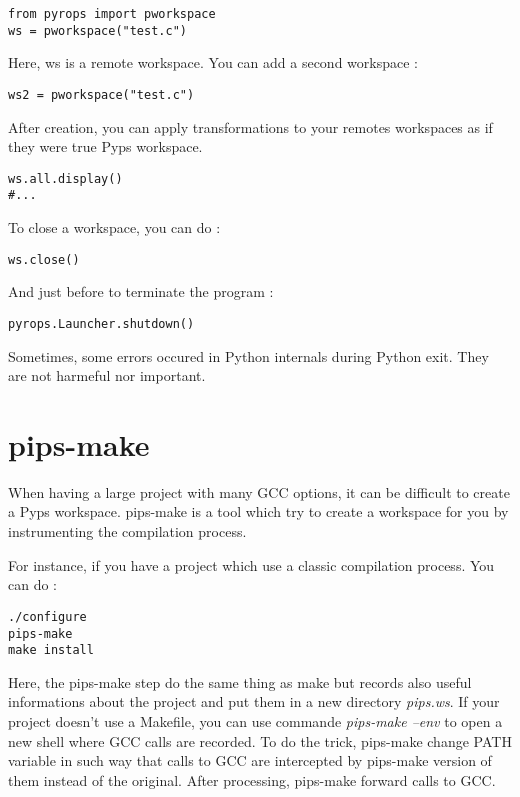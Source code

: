 \documentclass[a4paper]{article}
\begin{document}
\begin{lstlisting}
from pyrops import pworkspace
ws = pworkspace("test.c")
\end{lstlisting}

Here, ws is a remote workspace. You can add a second workspace :
\begin{lstlisting}
ws2 = pworkspace("test.c")
\end{lstlisting}

After creation, you can apply transformations to your remotes workspaces as if they were true Pyps workspace.
\begin{lstlisting}
ws.all.display()
#...
\end{lstlisting}

To close a workspace, you can do :
\begin{lstlisting}
ws.close()
\end{lstlisting}

And just before to terminate the program :
\begin{lstlisting}
pyrops.Launcher.shutdown()
\end{lstlisting}

Sometimes, some errors occured in Python internals during Python exit. They are not harmeful nor important.

\section{pips-make}
When having a large project with many GCC options, it can be difficult to create a Pyps workspace. pips-make is a tool which try to create a workspace for you by instrumenting the compilation process.

For instance, if you have a project which use a classic compilation process. You can do :

\begin{lstlisting}
./configure
pips-make
make install
\end{lstlisting}

Here, the pips-make step do the same thing as make but records also useful informations about the project and put them in a new directory \emph{pips.ws}.
If your project doesn't use a Makefile, you can use commande \emph{pips-make --env} to open a new shell where GCC calls are recorded. To do the trick, pips-make change PATH variable in such way that calls to GCC are intercepted by pips-make version of them instead of the original. After processing, pips-make forward calls to GCC.
\end{document}
